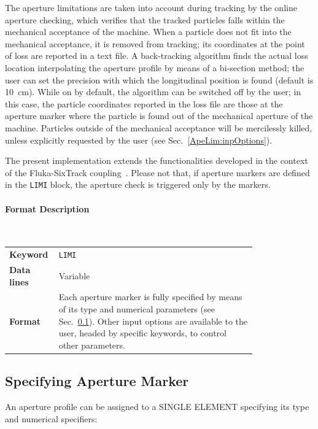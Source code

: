 The aperture limitations are taken into account during tracking by the online aperture checking, which
verifies that the tracked particles falls within the mechanical acceptance of the machine. When a
particle does not fit into the mechanical acceptance, it is removed from tracking; its
coordinates at the point of loss are reported in a text file. A back-tracking algorithm
finds the actual loss location interpolating the aperture profile by means of a bi-section
method; the user can set the precision with which the longitudinal position is found
(default is 10~cm).
While on by default, the algorithm can be switched off by the user; in this case, the
particle coordinates reported in the loss file are those at the aperture marker where
the particle is found out of the mechanical aperture of the machine.
Particles outside of the mechanical acceptance will be mercilessly killed, unless
explicitly requested by the user (see Sec.~\ref{ApeLim:inpOptions}).

The present implementation extends the functionalities developed in the
context of the Fluka-SixTrack coupling~\cite{coupling:1,coupling:2}.
Please not that, if aperture markers are defined in the \texttt{LIMI} block,
the aperture check is triggered only by the markers.

\paragraph{Format Description}~

\bigskip
\begin{tabular}{@{}lp{0.8\linewidth}}
    \textbf{Keyword}    & \texttt{LIMI}\index{LIMI} \\
    \textbf{Data lines} & Variable \\
    \textbf{Format}     & Each aperture marker is fully specified by means of its type and
                          numerical parameters (see Sec.~\ref{ApeLim:ApeSpecs}).
                          Other input options are available to the user,
                          headed by specific keywords, to control other parameters.
\end{tabular}

\bigskip
\subsection{Specifying Aperture Marker}\label{ApeLim:ApeSpecs}
An aperture profile can be assigned to a SINGLE ELEMENT specifying its type and
numerical specifiers:

